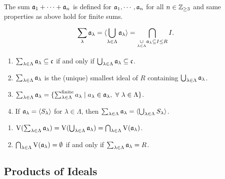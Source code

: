 \begin{remark}
    The sum $\mathfrak{a}_1 + \cdots + \mathfrak{a}_n$ is defined for $\mathfrak{a}_1,\cdots,\mathfrak{a}_n$ for all $n \in \mathbb{Z}_{\geq 3}$ and same properties as above hold for finite sums.
\end{remark}

\begin{definition}
    \[\sum_{\lambda} \mathfrak{a}_\lambda = \langle \bigcup_{\lambda \in \Lambda} \mathfrak{a}_\lambda \rangle = \bigcap_{\underset {\lambda \in \Lambda} \cup \mathfrak{a}_\lambda \subseteq I \leq R} I.\]
\end{definition}

\begin{fact}
    \begin{enumerate}
        \item $\sum_{\lambda \in \Lambda} \mathfrak{a}_\lambda \subseteq \mathfrak{c}$ if and only if $\bigcup_{\lambda \in \Lambda} \mathfrak{a}_\lambda \subseteq \mathfrak{c}$.
        \item $\sum_{\lambda \in \Lambda} \mathfrak{a}_\lambda$ is the (unique) smallest ideal of $R$ containing $\bigcup_{\lambda \in \Lambda} \mathfrak{a}_\lambda$.
        \item $\sum_{\lambda \in \Lambda} \mathfrak{a}_\lambda = \{\sum_{\lambda \in \Lambda}^{\text{finite}}a_\lambda \mid a_\lambda \in \mathfrak{a}_\lambda, \ \forall \  \lambda \in \Lambda\}$.
        \item If $\mathfrak{a}_\lambda = \langle S_\lambda \rangle$ for $\lambda \in \Lambda$, then $\sum_{\lambda \in \Lambda} \mathfrak{a}_\lambda = \langle \bigcup_{\lambda \in \Lambda}S_\lambda \rangle$.
    \end{enumerate}
\end{fact}

\begin{fact}
    \begin{enumerate}
        \item $\operatorname{V}(\sum_{\lambda \in \Lambda} \mathfrak{a}_\lambda) = \operatorname{V}(\bigcup_{\lambda \in \Lambda} \mathfrak{a}_\lambda) = \bigcap_{\lambda \in \Lambda} \operatorname{V}(\mathfrak{a}_\lambda)$.
        \item $\bigcap_{\lambda \in \Lambda} \operatorname{V}(\mathfrak{a}_\lambda) = \emptyset$ if and only if $\sum_{\lambda \in \Lambda} \mathfrak{a}_\lambda = R$.
    \end{enumerate}
\end{fact}

\subsection*{Products of Ideals}

